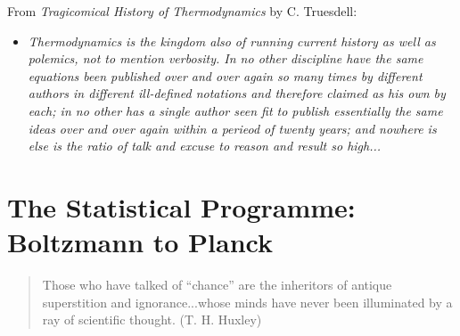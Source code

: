 \noindent
From \emph{Tragicomical History of Thermodynamics} by C. Truesdell:
\begin{itemize}
\item \emph{Thermodynamics is the kingdom also of running current history as well as polemics, not to mention verbosity.
In no other discipline have the same equations been published over and over again so many times by different authors in different ill-defined notations and therefore claimed as his own by each; in no other has a single author seen fit to publish essentially the same ideas over and over again within a perieod of twenty years; and nowhere is else is the ratio of talk and excuse  to reason and result so high...}
\end{itemize}


\chapter{The Statistical Programme: Boltzmann to Planck}
\small
\begin{quote}
Those who have talked of ``chance'' are the
inheritors of antique superstition and ignorance...whose minds have never
been illuminated by a ray of scientific thought. (T. H. Huxley)
\end{quote}
\normalsize


